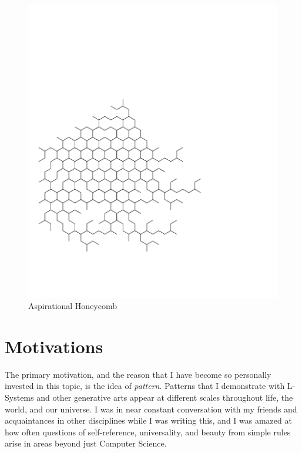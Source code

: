 \documentclass[12pt,twoside]{reedthesis}
\begin{document}


	\begin{figure}[h]
	\centering
	\includegraphics[clip=true, viewport=0in 1.5in 7.5in 8.5in, scale=0.4]{Images/Introduction3} 
	\caption[Aspirational Honeycomb]{Aspirational Honeycomb\footnotemark}
	\label {Introduction3}
	\end{figure}

\section*{Motivations}

	The primary motivation, and the reason that I have become so personally invested in this topic, is the idea of \textit{pattern}. Patterns that I demonstrate with L-Systems and other generative arts appear at different scales throughout life, the world, and our universe. I was in near constant conversation with my friends and acquaintances in other disciplines while I was writing this, and I was amazed at how often questions of self-reference, universality, and beauty from simple rules arise in areas beyond just Computer Science. %
	
\end{document}
